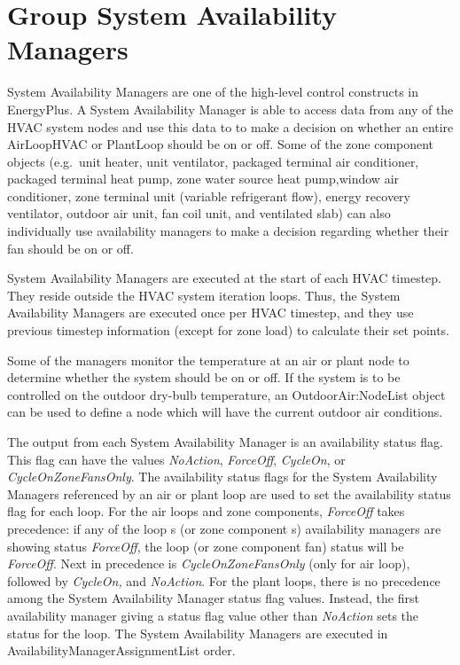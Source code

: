\section{Group System Availability Managers}\label{group-system-availability-managers}

System Availability Managers are one of the high-level control constructs in EnergyPlus. A System Availability Manager is able to access data from any of the HVAC system nodes and use this data to to make a decision on whether an entire AirLoopHVAC or PlantLoop should be on or off. Some of the zone component objects (e.g.~unit heater, unit ventilator, packaged terminal air conditioner, packaged terminal heat pump, zone water source heat pump,window air conditioner, zone terminal unit (variable refrigerant flow), energy recovery ventilator, outdoor air unit, fan coil unit, and ventilated slab) can also individually use availability managers to make a decision regarding whether their fan should be on or off.

System Availability Managers are executed at the start of each HVAC timestep. They reside outside the HVAC system iteration loops. Thus, the System Availability Managers are executed once per HVAC timestep, and they use previous timestep information (except for zone load) to calculate their set points.

Some of the managers monitor the temperature at an air or plant node to determine whether the system should be on or off. If the system is to be controlled on the outdoor dry-bulb temperature, an OutdoorAir:NodeList object can be used to define a node which will have the current outdoor air conditions.

The output from each System Availability Manager is an availability status flag. This flag can have the values \emph{NoAction}, \emph{ForceOff}, \emph{CycleOn}, or \emph{CycleOnZoneFansOnly}. The availability status flags for the System Availability Managers referenced by an air or plant loop are used to set the availability status flag for each loop. For the air loops and zone components, \emph{ForceOff} takes precedence: if any of the loop s (or zone component s) availability managers are showing status \emph{ForceOff}, the loop (or zone component fan) status will be \emph{ForceOff}. Next in precedence is \emph{CycleOnZoneFansOnly} (only for air loop), followed by \emph{CycleOn,} and \emph{NoAction}. For the plant loops, there is no precedence among the System Availability Manager status flag values. Instead, the first availability manager giving a status flag value other than \emph{NoAction} sets the status for the loop. The System Availability Managers are executed in AvailabilityManagerAssignmentList order.


